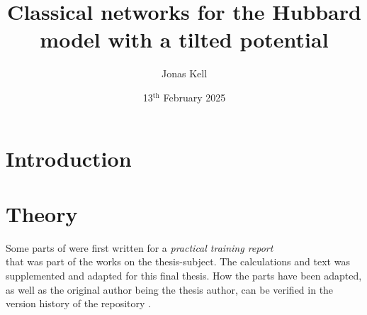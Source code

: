 \documentclass[
headings=optiontohead,              %
12pt,                               %
DIV=13,                             %
twoside=false,                      %
open=right,                         %
BCOR=00mm,                          %
toc=bibliographynumbered            %
]{scrreport}
\title{Classical networks for the Hubbard model with a tilted potential}
\author{Jonas Kell}
\date{13$^\text{th}$ February 2025}
\begin{document}
\thispagestyle{empty}                           %
\cleardoublepage                                %
\pagestyle{scrheadings}                         %
\renewcommand{\contentsname}{Table of Contents} %
\tableofcontents                                %
\cleardoublepage                                %

\clearpairofpagestyles
\ihead{\leftmark}
\ohead{\Ifstr{\leftmark}{\rightmark}{}{\rightmark}}
\cfoot*{\pagemark}

\renewcommand{\theequation}{\arabic{equation}} %

\chapter{Introduction}
\label{sec:introduction}

\FloatBarrier

\chapter{Theory}
\label{sec:theory}

Some parts of  were first written for a \emph{practical training report}\\  that was part of the works on the thesis-subject.
The calculations and text was supplemented and adapted for this final thesis. 
How the parts have been adapted, as well as the original author being the thesis author, can be verified in the version history of the repository \cite{selfDocument}.
\end{document}
